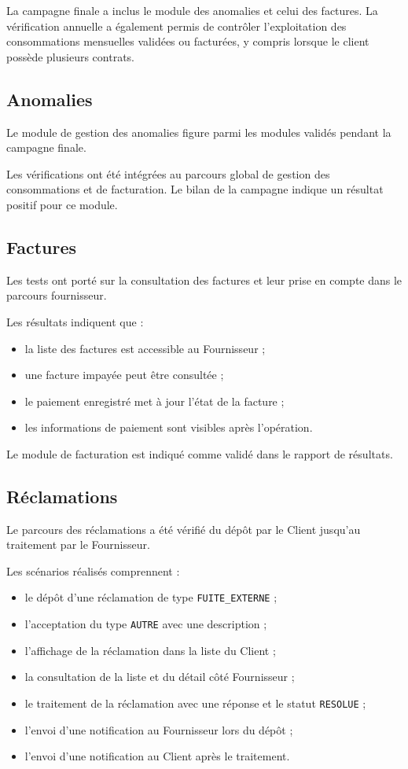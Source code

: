 La campagne finale a inclus le module des anomalies et celui des factures. La vérification annuelle a également permis de contrôler l'exploitation des consommations mensuelles validées ou facturées, y compris lorsque le client possède plusieurs contrats.

\subsection{Anomalies}

Le module de gestion des anomalies figure parmi les modules validés pendant la campagne finale.

Les vérifications ont été intégrées au parcours global de gestion des consommations et de facturation. Le bilan de la campagne indique un résultat positif pour ce module.

\subsection{Factures}

Les tests ont porté sur la consultation des factures et leur prise en compte dans le parcours fournisseur.

Les résultats indiquent que :
\begin{itemize}
    \item la liste des factures est accessible au Fournisseur ;
    \item une facture impayée peut être consultée ;
    \item le paiement enregistré met à jour l'état de la facture ;
    \item les informations de paiement sont visibles après l'opération.
\end{itemize}

Le module de facturation est indiqué comme validé dans le rapport de résultats.

\subsection{Réclamations}

Le parcours des réclamations a été vérifié du dépôt par le Client jusqu'au traitement par le Fournisseur.

Les scénarios réalisés comprennent :
\begin{itemize}
    \item le dépôt d'une réclamation de type \texttt{FUITE\_EXTERNE} ;
    \item l'acceptation du type \texttt{AUTRE} avec une description ;
    \item l'affichage de la réclamation dans la liste du Client ;
    \item la consultation de la liste et du détail côté Fournisseur ;
    \item le traitement de la réclamation avec une réponse et le statut \texttt{RESOLUE} ;
    \item l'envoi d'une notification au Fournisseur lors du dépôt ;
    \item l'envoi d'une notification au Client après le traitement.
\end{itemize}

